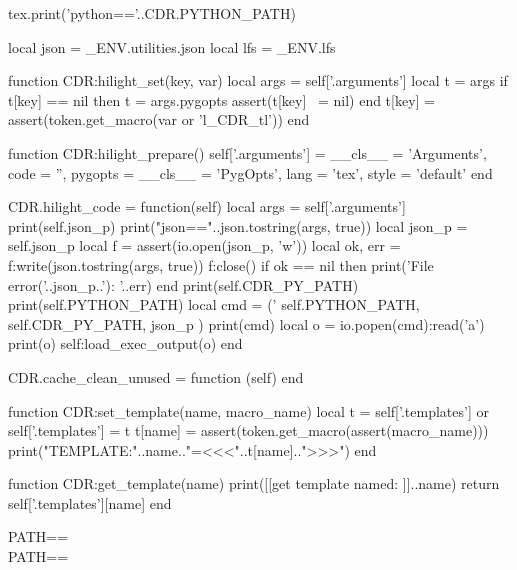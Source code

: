 \begin{luacode}

tex.print('python=='..CDR.PYTHON_PATH)

local json = _ENV.utilities.json
local lfs   = _ENV.lfs


function CDR:hilight_set(key, var)
  local args = self['.arguments']
  local t = args
  if t[key] == nil then
    t = args.pygopts
    assert(t[key] ~= nil)
  end
  t[key] = assert(token.get_macro(var or 'l_CDR_tl'))
end

function CDR:hilight_prepare()
  self['.arguments'] = {
    __cls__ = 'Arguments',
    code = '',
    pygopts = {
      __cls__ = 'PygOpts',
      lang = 'tex',
      style = 'default'
    }
  }
end

CDR.hilight_code = function(self)
  local args = self['.arguments']
  print(self.json_p)
  print("json=="..json.tostring(args, true))
  local json_p = self.json_p
  local f = assert(io.open(json_p, 'w'))
  local ok, err = f:write(json.tostring(args, true))
  f:close()
  if ok == nil then
    print('File error('..json_p..'): '..err)
  end
  print(self.CDR_PY_PATH)
  print(self.PYTHON_PATH)
  local cmd = ('%
    self.PYTHON_PATH,
    self.CDR_PY_PATH,
    json_p
  )
  print(cmd)
  local o = io.popen(cmd):read('a')
  print(o)
  self:load_exec_output(o)
end

CDR.cache_clean_unused = function (self)
end

function CDR:set_template(name, macro_name)
  local t = self['.templates'] or {}
  self['.templates'] = t
  t[name] = assert(token.get_macro(assert(macro_name)))
  print("TEMPLATE:"..name.."=<<<"..t[name]..">>>")
end

function CDR:get_template(name)
  print([[get template named: ]]..name)
  return self['.templates'][name]
end

\end{luacode}


PATH==\\
PATH==\\


